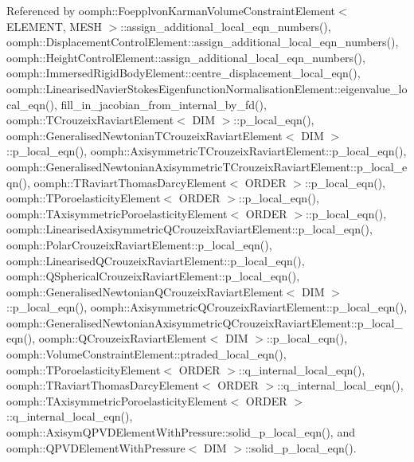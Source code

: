 Referenced by oomph\+::\+Foepplvon\+Karman\+Volume\+Constraint\+Element$<$ E\+L\+E\+M\+E\+N\+T, M\+E\+S\+H $>$\+::assign\+\_\+additional\+\_\+local\+\_\+eqn\+\_\+numbers(), oomph\+::\+Displacement\+Control\+Element\+::assign\+\_\+additional\+\_\+local\+\_\+eqn\+\_\+numbers(), oomph\+::\+Height\+Control\+Element\+::assign\+\_\+additional\+\_\+local\+\_\+eqn\+\_\+numbers(), oomph\+::\+Immersed\+Rigid\+Body\+Element\+::centre\+\_\+displacement\+\_\+local\+\_\+eqn(), oomph\+::\+Linearised\+Navier\+Stokes\+Eigenfunction\+Normalisation\+Element\+::eigenvalue\+\_\+local\+\_\+eqn(), fill\+\_\+in\+\_\+jacobian\+\_\+from\+\_\+internal\+\_\+by\+\_\+fd(), oomph\+::\+T\+Crouzeix\+Raviart\+Element$<$ D\+I\+M $>$\+::p\+\_\+local\+\_\+eqn(), oomph\+::\+Generalised\+Newtonian\+T\+Crouzeix\+Raviart\+Element$<$ D\+I\+M $>$\+::p\+\_\+local\+\_\+eqn(), oomph\+::\+Axisymmetric\+T\+Crouzeix\+Raviart\+Element\+::p\+\_\+local\+\_\+eqn(), oomph\+::\+Generalised\+Newtonian\+Axisymmetric\+T\+Crouzeix\+Raviart\+Element\+::p\+\_\+local\+\_\+eqn(), oomph\+::\+T\+Raviart\+Thomas\+Darcy\+Element$<$ O\+R\+D\+E\+R $>$\+::p\+\_\+local\+\_\+eqn(), oomph\+::\+T\+Poroelasticity\+Element$<$ O\+R\+D\+E\+R $>$\+::p\+\_\+local\+\_\+eqn(), oomph\+::\+T\+Axisymmetric\+Poroelasticity\+Element$<$ O\+R\+D\+E\+R $>$\+::p\+\_\+local\+\_\+eqn(), oomph\+::\+Linearised\+Axisymmetric\+Q\+Crouzeix\+Raviart\+Element\+::p\+\_\+local\+\_\+eqn(), oomph\+::\+Polar\+Crouzeix\+Raviart\+Element\+::p\+\_\+local\+\_\+eqn(), oomph\+::\+Linearised\+Q\+Crouzeix\+Raviart\+Element\+::p\+\_\+local\+\_\+eqn(), oomph\+::\+Q\+Spherical\+Crouzeix\+Raviart\+Element\+::p\+\_\+local\+\_\+eqn(), oomph\+::\+Generalised\+Newtonian\+Q\+Crouzeix\+Raviart\+Element$<$ D\+I\+M $>$\+::p\+\_\+local\+\_\+eqn(), oomph\+::\+Axisymmetric\+Q\+Crouzeix\+Raviart\+Element\+::p\+\_\+local\+\_\+eqn(), oomph\+::\+Generalised\+Newtonian\+Axisymmetric\+Q\+Crouzeix\+Raviart\+Element\+::p\+\_\+local\+\_\+eqn(), oomph\+::\+Q\+Crouzeix\+Raviart\+Element$<$ D\+I\+M $>$\+::p\+\_\+local\+\_\+eqn(), oomph\+::\+Volume\+Constraint\+Element\+::ptraded\+\_\+local\+\_\+eqn(), oomph\+::\+T\+Poroelasticity\+Element$<$ O\+R\+D\+E\+R $>$\+::q\+\_\+internal\+\_\+local\+\_\+eqn(), oomph\+::\+T\+Raviart\+Thomas\+Darcy\+Element$<$ O\+R\+D\+E\+R $>$\+::q\+\_\+internal\+\_\+local\+\_\+eqn(), oomph\+::\+T\+Axisymmetric\+Poroelasticity\+Element$<$ O\+R\+D\+E\+R $>$\+::q\+\_\+internal\+\_\+local\+\_\+eqn(), oomph\+::\+Axisym\+Q\+P\+V\+D\+Element\+With\+Pressure\+::solid\+\_\+p\+\_\+local\+\_\+eqn(), and oomph\+::\+Q\+P\+V\+D\+Element\+With\+Pressure$<$ D\+I\+M $>$\+::solid\+\_\+p\+\_\+local\+\_\+eqn().


